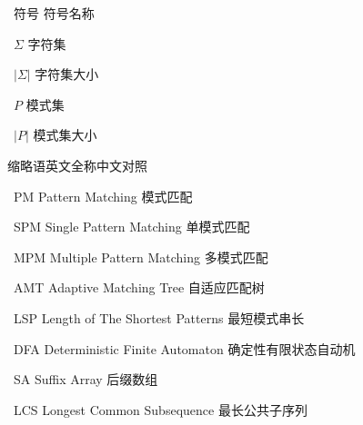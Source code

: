 \XDUpremainmatter

\begin{symbollist}
\item ~符号 \hspace{12em} 符号名称\\
\item ~$\Sigma$ \hspace{14em} 字符集
\item ~$|\Sigma|$ \hspace{13em} 字符集大小
\item ~$P$ \hspace{14em} 模式集
\item ~$|P|$ \hspace{13em} 模式集大小
\end{symbollist}

\begin{abbreviationlist}
\item 缩略语\hspace{6em}英文全称\hspace{13em}中文对照\\
\item ~PM \hspace{5em} Pattern Matching \hspace{10em} 模式匹配
\item ~SPM \hspace{3.5em} Single Pattern Matching \hspace{8em} 单模式匹配
\item ~MPM \hspace{3.5em} Multiple Pattern Matching \hspace{6.5em} 多模式匹配
\item ~AMT \hspace{3.5em} Adaptive Matching Tree \hspace{7.5em} 自适应匹配树
\item ~LSP \hspace{3.5em} Length of The Shortest Patterns \hspace{4.5em} 最短模式串长
\item ~DFA \hspace{3.5em}  Deterministic Finite Automaton \hspace{3em} 确定性有限状态自动机
\item ~SA \hspace{5em} Suffix Array \hspace{11em} 后缀数组
\item ~LCS \hspace{3.5em} Longest Common Subsequence \hspace{4.55em} 最长公共子序列
  
\end{abbreviationlist}
